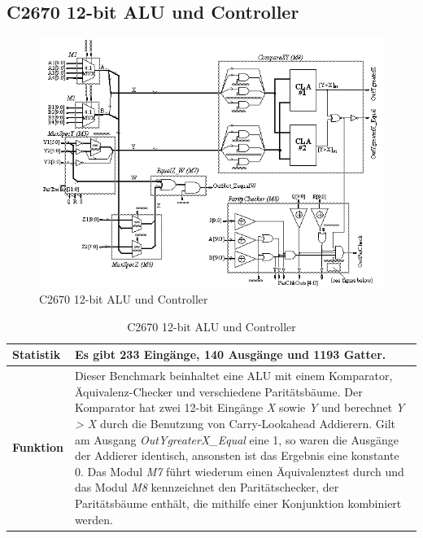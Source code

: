 \subsection*{C2670 12-bit ALU und Controller}
\label{sec:c2670}
\begin{figure}[bth]
	\centering
	\includegraphics[scale=0.6]{./img/c2670}
	\caption[C2670 12-bit ALU und Controller]{C2670 12-bit ALU und Controller \cite{h1999}}
	\label{fig:c2670}
\end{figure}
\begin{table}[bth]
	\centering
	\caption{C2670 12-bit ALU und Controller}
	\label{tab:c2670}
	\begin{tabular}{ | p{2cm} | p{12cm} |}
		\hline
		\textbf{Statistik} & Es gibt 233 Eingänge, 140 Ausgänge und 1193 Gatter. \\\hline
		\textbf{Funktion} & Dieser Benchmark beinhaltet eine ALU mit einem Komparator, Äquivalenz-Checker und verschiedene Paritätsbäume. Der Komparator hat zwei 12-bit Eingänge \emph{X} sowie \emph{Y} und berechnet \emph{Y > X} durch die Benutzung von Carry-Lookahead Addierern. Gilt am Ausgang \emph{OutYgreaterX\_Equal} eine 1, so waren die Ausgänge der Addierer identisch, ansonsten ist das Ergebnis eine konstante 0. Das Modul \emph{M7} führt wiederum einen Äquivalenztest durch und das Modul \emph{M8} kennzeichnet den Paritätschecker, der Paritätsbäume enthält, die mithilfe einer Konjunktion kombiniert werden. \\\hline
	\end{tabular}
\end{table}
\newpage
